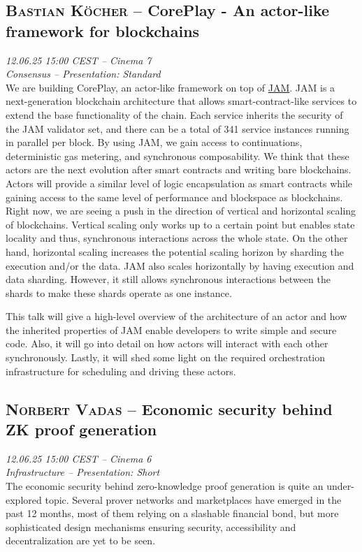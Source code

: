 \subsection {\textsc{Bastian Köcher}  -- CorePlay - An actor-like framework for blockchains} \noindent \textit {12.06.25 15:00 CEST -- Cinema 7\\ Consensus -- Presentation: Standard}\\[1em] We are building CorePlay, an actor-like framework on top of \href{https://graypaper.com/}{JAM}. JAM is a next-generation blockchain architecture that allows smart-contract-like services to extend the base functionality of the chain. Each service inherits the security of the JAM validator set, and there can be a total of 341 service instances running in parallel per block. By using JAM, we gain access to continuations, deterministic gas metering, and synchronous composability. We think that these actors are the next evolution after smart contracts and writing bare blockchains. Actors will provide a similar level of logic encapsulation as smart contracts while gaining access to the same level of performance and blockspace as blockchains. Right now, we are seeing a push in the direction of vertical and horizontal scaling of blockchains. Vertical scaling only works up to a certain point but enables state locality and thus, synchronous interactions across the whole state. On the other hand, horizontal scaling increases the potential scaling horizon by sharding the execution and/or the data. JAM also scales horizontally by having execution and data sharding. However, it still allows synchronous interactions between the shards to make these shards operate as one instance.

This talk will give a high-level overview of the architecture of an actor and how the inherited properties of JAM enable developers to write simple and secure code. Also, it will go into detail on how actors will interact with each other synchronously.\newline
Lastly, it will shed some light on the required orchestration infrastructure for scheduling and driving these actors.

\clearpage
\subsection {\textsc{Norbert Vadas}  -- Economic security behind ZK proof generation} \noindent \textit {12.06.25 15:00 CEST -- Cinema 6\\ Infrastructure -- Presentation: Short}\\[1em] The economic security behind zero-knowledge proof generation is quite an under-explored topic. Several prover networks and marketplaces have emerged in the past 12 months, most of them relying on a slashable financial bond, but more sophisticated design mechanisms ensuring security, accessibility and decentralization are yet to be seen.

